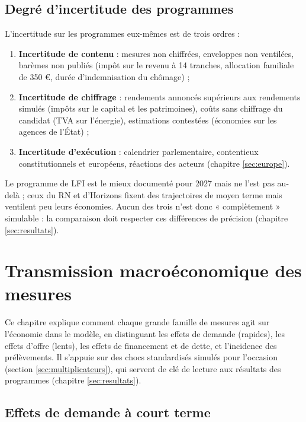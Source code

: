 \documentclass[
  11pt,
  11pt,
  a4paper,
  openany]{book}
\providecommand{\tightlist}{%
  \setlength{\itemsep}{0pt}\setlength{\parskip}{0pt}}
\begin{document}
\hypertarget{sec:incertitude-programmes}{%
\section{Degré d'incertitude des
programmes}\label{sec:incertitude-programmes}}

L'incertitude sur les programmes eux-mêmes est de trois ordres :

\begin{enumerate}
\def\labelenumi{\arabic{enumi}.}
\tightlist
\item
  \textbf{Incertitude de contenu} : mesures non chiffrées, enveloppes
  non ventilées, barèmes non publiés (impôt sur le revenu à 14 tranches,
  allocation familiale de 350 €, durée d'indemnisation du chômage) ;
\item
  \textbf{Incertitude de chiffrage} : rendements annoncés supérieurs aux
  rendements simulés (impôts sur le capital et les patrimoines), coûts
  sans chiffrage du candidat (TVA sur l'énergie), estimations contestées
  (économies sur les agences de l'État) ;
\item
  \textbf{Incertitude d'exécution} : calendrier parlementaire,
  contentieux constitutionnels et européens, réactions des acteurs
  (chapitre \ref{sec:europe}).
\end{enumerate}

Le programme de LFI est le mieux documenté pour 2027 mais ne l'est pas
au-delà ; ceux du RN et d'Horizons fixent des trajectoires de moyen
terme mais ventilent peu leurs économies. Aucun des trois n'est donc «
complètement » simulable : la comparaison doit respecter ces différences
de précision (chapitre \ref{sec:resultats}).

\hypertarget{sec:transmission}{%
\chapter{Transmission macroéconomique des
mesures}\label{sec:transmission}}

Ce chapitre explique comment chaque grande famille de mesures agit sur
l'économie dans le modèle, en distinguant les effets de demande
(rapides), les effets d'offre (lents), les effets de financement et de
dette, et l'incidence des prélèvements. Il s'appuie sur des chocs
standardisés simulés pour l'occasion (section
\ref{sec:multiplicateurs}), qui servent de clé de lecture aux résultats
des programmes (chapitre \ref{sec:resultats}).

\hypertarget{sec:demande-ct}{%
\section{Effets de demande à court terme}\label{sec:demande-ct}}
\end{document}
